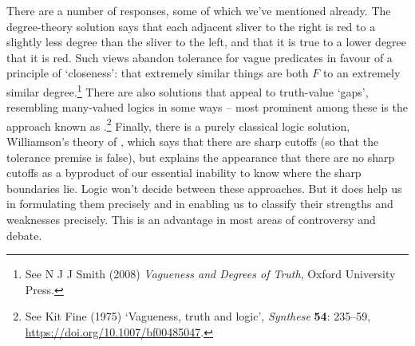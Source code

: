 There are a number of responses, some of which we've mentioned already. The degree-theory solution says that each adjacent sliver to the right is red to a slightly less degree than the sliver to the left, and that it is true to a lower degree that it is red. Such views abandon tolerance for vague predicates in favour of a principle of `closeness': that extremely similar things are both $F$ to an extremely similar degree.\footnote{See N J J Smith (2008) \emph{Vagueness and Degrees of Truth}, Oxford University Press.} There are also solutions that appeal to truth-value `gaps', resembling many-valued logics in some ways – most prominent among these is the approach known as .\footnote{See Kit Fine (1975) `Vagueness, truth and logic', \emph{Synthese} \textbf{54}: 235–59, \url{https://doi.org/10.1007/bf00485047}.} Finally, there is a purely classical logic solution, Williamson's theory of , which says that there are sharp cutoffs (so that the tolerance premise is false), but explains the appearance that there are no sharp cutoffs as a byproduct of our essential inability to know where the sharp boundaries lie. Logic won't decide between these approaches. But it does help us in formulating them precisely and in enabling us to classify their strengths and weaknesses precisely. This is an advantage in most areas of controversy and debate.



